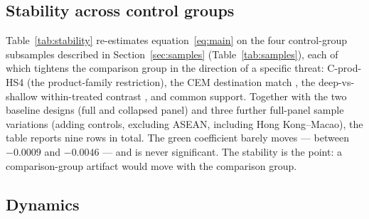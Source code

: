 \documentclass[12pt]{article}
\begin{document}
\subsection{Stability across control groups}

Table~\ref{tab:stability} re-estimates equation~\eqref{eq:main} on the four
control-group subsamples described in Section~\ref{sec:samples}
(Table~\ref{tab:samples}), each of which tightens the comparison group in the
direction of a specific threat: C-prod-HS4 (the product-family restriction), the CEM
destination match \citep{iacus2012}, the deep-vs-shallow within-treated contrast
\citep{abman2024}, and common support. Together with the two baseline designs (full and
collapsed panel) and three further full-panel sample variations (adding controls,
excluding ASEAN, including Hong Kong--Macao), the table reports nine rows in total.
The green coefficient barely moves --- between $-0.0009$ and $-0.0046$ --- and is never
significant. The stability is the point: a comparison-group artifact would move with the
comparison group.

\begin{table}[htbp]
\centering
\caption{Stability of the EP$\times$green coefficient across estimation designs (WB index)}
\label{tab:stability}

\end{table}

\subsection{Dynamics}
\end{document}
